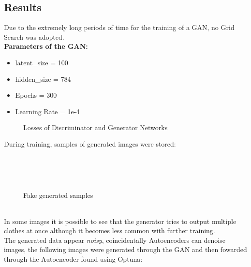 \documentclass[11pt,a4paper,twocolumn]{IEEEtran}
\newcommand{\thinsepline}{\noindent\makebox[\linewidth]{\rule{7.5cm}{0.02pt}}}
\begin{document}
		\subsection{\textbf{Results}}
		Due to the extremely long periods of time for the training of a GAN, no Grid Search was adopted.
		\thinsepline\\
		\textbf{Parameters of the GAN:}
		\begin{itemize}
			\item latent\_size = 100
			\item hidden\_size = 784
			\item Epochs = 300
			\item Learning Rate = 1e-4
		\end{itemize}
		\thinsepline\newpage
		\begin{figure}[h]
			\centering
			
			\caption{Losses of Discriminator and Generator Networks}
			\label{fig:ganloss}
		\end{figure}
	During training, samples of generated images were stored:
	\begin{figure}[h]
		\centering
		\vspace*{-.7cm}\\
		\vspace*{-.7cm}\\
		\vspace*{-.5cm}\\
		\caption{Fake generated samples}
		\label{fig:ganimgs}
	\end{figure}\\
	In some images it is possible to see that the generator tries to output multiple clothes at once although it becomes less common with further training.\\
	The generated data appear \textit{noisy}, coincidentally Autoencoders can denoise images, the following images were generated through the GAN and then fowarded through the Autoencoder found using Optuna:
\end{document}
